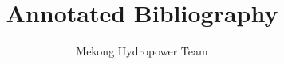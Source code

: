 \documentclass[12pt]{amsart}
\title{Annotated Bibliography}
\author{Mekong Hydropower Team}
\begin{document}
\maketitle





\nocite{*}



\end{document}
